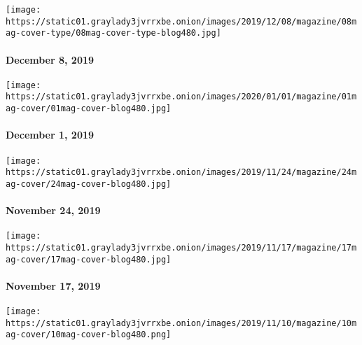 \href{https://www.nytimes3xbfgragh.onion/issue/magazine/2019/12/06/the-12819-issue}{}

\texttt{[image: https://static01.graylady3jvrrxbe.onion/images/2019/12/08/magazine/08mag-cover-type/08mag-cover-type-blog480.jpg]}

\hypertarget{december-8-2019}{%
\paragraph{December 8, 2019}\label{december-8-2019}}

\href{https://www.nytimes3xbfgragh.onion/issue/magazine/2019/12/03/the-12119-issue}{}

\texttt{[image: https://static01.graylady3jvrrxbe.onion/images/2020/01/01/magazine/01mag-cover/01mag-cover-blog480.jpg]}

\hypertarget{december-1-2019}{%
\paragraph{December 1, 2019}\label{december-1-2019}}

\href{https://www.nytimes3xbfgragh.onion/issue/magazine/2019/11/22/the-112419-issue}{}

\texttt{[image: https://static01.graylady3jvrrxbe.onion/images/2019/11/24/magazine/24mag-cover/24mag-cover-blog480.jpg]}

\hypertarget{november-24-2019}{%
\paragraph{November 24, 2019}\label{november-24-2019}}

\href{https://www.nytimes3xbfgragh.onion/issue/magazine/2019/11/15/the-111719-issue}{}

\texttt{[image: https://static01.graylady3jvrrxbe.onion/images/2019/11/17/magazine/17mag-cover/17mag-cover-blog480.jpg]}

\hypertarget{november-17-2019}{%
\paragraph{November 17, 2019}\label{november-17-2019}}

\href{https://www.nytimes3xbfgragh.onion/issue/magazine/2019/11/09/the-111019-issue}{}

\texttt{[image: https://static01.graylady3jvrrxbe.onion/images/2019/11/10/magazine/10mag-cover/10mag-cover-blog480.png]}

